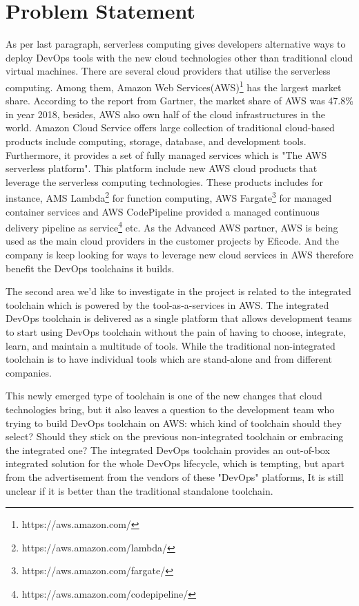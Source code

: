 \section{Problem Statement}
As per last paragraph, serverless computing gives developers alternative ways to deploy DevOps tools with the new cloud technologies other than traditional cloud virtual machines. There are several cloud providers that utilise the serverless computing.
Among them, Amazon Web Services(AWS)\footnote{https://aws.amazon.com/} has the largest market share. According to the report from Gartner, the market share of AWS was 47.8\% in year 2018, besides, AWS also own half of the cloud infrastructures in the world\cite{GartnerS47:online}.
Amazon Cloud Service offers large collection of traditional cloud-based products include computing, storage, database, and development tools. Furthermore, it provides a set of fully managed services which is "The AWS serverless platform". \cite{Serverle81:online} This platform include new AWS cloud products that leverage the serverless computing technologies. These products includes for instance, AMS Lambda\footnote{https://aws.amazon.com/lambda/} for function computing, AWS Fargate\footnote{https://aws.amazon.com/fargate/} for managed container services and AWS CodePipeline provided a managed continuous delivery pipeline as service\footnote{https://aws.amazon.com/codepipeline/} etc. As the Advanced AWS partner, AWS is being used as the main cloud providers in the customer projects by Eficode. And the company is keep looking for ways to leverage new cloud services in AWS therefore benefit the DevOps toolchains it builds.
\par
The second area we'd like to investigate in the project is related to the integrated toolchain which is powered by the tool-as-a-services in AWS.
The integrated DevOps toolchain is delivered as a single platform that allows development teams to start using DevOps toolchain without the pain of having to choose, integrate, learn, and maintain a multitude of tools. While the traditional non-integrated toolchain is to have individual tools which are stand-alone and from different companies.
\par
This newly emerged type of toolchain is one of the new changes that cloud technologies bring, but it also leaves a question to the development team who trying to build DevOps toolchain on AWS: which kind of toolchain should they select? Should they stick on the previous non-integrated toolchain or embracing the integrated one? The integrated DevOps toolchain provides an out-of-box integrated solution for the whole DevOps lifecycle, which is tempting, but apart from the advertisement from the vendors of these "DevOps" platforms, It is still unclear if it is better than the traditional standalone toolchain. 
